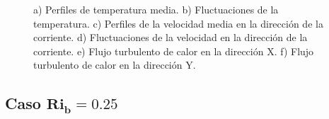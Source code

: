 \begin{figure}[H]
    
   \caption{a) Perfiles de temperatura media. b) Fluctuaciones de la temperatura. c) Perfiles de la velocidad media en la dirección de la corriente. d) Fluctuaciones de la velocidad en la dirección de la corriente. e) Flujo turbulento de calor en la dirección X. f) Flujo turbulento de calor en la dirección Y.} 
 
 \label{fig:guo}
\end{figure}

\subsection{Caso $\mathbf{Ri_b}=0.25$}

